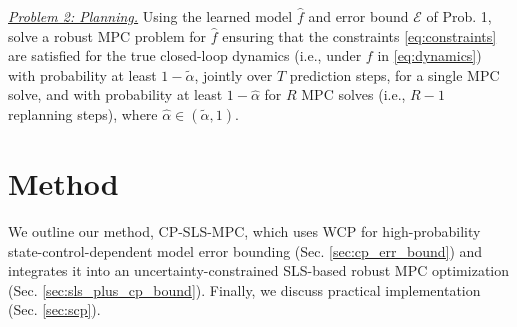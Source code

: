 \documentclass{l4dc2026}
\newcommand{\calib}{\mathcal{D}_{\mathrm{calib}}}
\newcommand{\methodnospace}{CP-SLS-MPC}
\newcommand{\red}[1]{{\color{red}{#1}}}
\renewcommand{\red}[1]{{\color{red}{#1}}}
\begin{document}

\noindent\textit{\underline{Problem 2: Planning.}} Using the learned model $\hat f$ and error bound $\mathcal{E}$ of Prob. 1, solve a robust MPC problem for $\hat f$ ensuring that the constraints \eqref{eq:constraints} are satisfied for the true closed-loop dynamics (i.e., under $f$ in \eqref{eq:dynamics}) with probability at least $1-\tilde \alpha$, jointly over $T$ prediction steps, for a single MPC solve, and with probability at least $1-\hat \alpha$ for $R$ MPC solves (i.e., $R-1$ replanning steps), where $\hat \alpha \in (\tilde \alpha, 1)$. 

\vspace{-10pt}
\section{Method}\label{sec:methods}
We outline our method, \methodnospace, which uses WCP for high-probability state-control-dependent model error bounding (Sec. \ref{sec:cp_err_bound}) and integrates it into an uncertainty-constrained SLS-based robust MPC optimization (Sec. \ref{sec:sls_plus_cp_bound}). Finally, we discuss practical implementation (Sec. \ref{sec:scp}). %

\vspace{-12pt}
\end{document}
